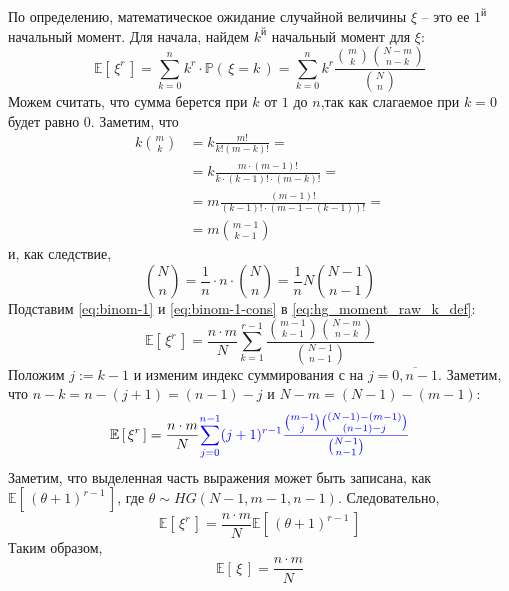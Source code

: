 \documentclass[
  russian,
  a4paper,
  russian]{scrreprt}
\begin{document}
По определению, математическое ожидание случайной величины \(\xi\) --
это ее \(1^\text{й}\) начальный момент. Для начала, найдем
\(k^\text{й}\) начальный момент для \(\xi\):
\begin{equation}\mathbb{E}\left[\, \xi^r \,\right]
= \sum_{k=0}^{n} k^r \cdot \mathbb{P}\left(\, \xi=k \,\right)
= \sum_{k=0}^{n} k^r\frac{\binom{m}{k}\binom{N-m}{n-k}}{\binom{N}{n}}\label{eq:hg_moment_raw_k_def}\end{equation}
Можем считать, что сумма берется при \(k\) от \(1\) до \(n\),так как
слагаемое при \(k=0\) будет равно \(0\). Заметим, что
\begin{equation}\begin{aligned}
    k\binom{m}{k} &= k \frac{m!}{k!(m-k)!} =\\
                &= k \frac{m \cdot (m-1)!}{k \cdot (k-1)! \cdot (m-k)!} =\\
                &= m \frac{(m-1)!}{(k-1)! \cdot (m-1 - (k-1))!} =\\
                &= m \binom{m-1}{k-1}
\end{aligned}\label{eq:binom-1}\end{equation} и, как следствие,
\begin{equation}\binom{N}{n}
= \frac{1}{n} \cdot n \cdot \binom{N}{n}
= \frac{1}{n} N \binom{N-1}{n-1}\label{eq:binom-1-cons}\end{equation}
Подставим \ref{eq:binom-1} и \ref{eq:binom-1-cons} в
\ref{eq:hg_moment_raw_k_def}:
\[\mathbb{E}\left[\, \xi^r \,\right] = \frac{n \cdot m}{N}
\sum_{k=1}^{r-1} \frac{\binom{m-1}{k-1}\binom{N-m}{n-k}}{\binom{N-1}{n-1}}\]
Положим \(j := k-1\) и изменим индекс суммирования с на
\(j = \overline{0, n-1}\). Заметим, что
\(n - k = n - (j+1) = (n-1) - j\) и \(N - m = (N-1) - (m-1)\):
\[\mathbb{E}\left[\, \xi^r \,\right] = \frac{n \cdot m}{N} \textcolor{blue}{\sum_{j=0}^{n-1} (j+1)^{r-1}
\frac{\binom{m-1}{j}\binom{(N-1) - (m-1)}{(n-1) - j}}{\binom{N-1}{n-1}}}\]
Заметим, что выделенная часть выражения может быть записана, как
\(\mathbb{E}\left[\, (\theta+1)^{r-1} \,\right]\), где
\(\theta \sim HG(N-1, m-1, n-1)\). Следовательно,
\begin{equation}\mathbb{E}\left[\, \xi^r \,\right] = \frac{n \cdot m}{N} \mathbb{E}\left[\, (\theta+1)^{r-1} \,\right]\label{eq:hg_moment_raw_k}\end{equation}
Таким образом, \begin{equation}\boxed{
    \mathbb{E}\left[\, \xi \,\right] = \frac{n \cdot m}{N}
}\label{eq:hg_expected}\end{equation}
\end{document}
